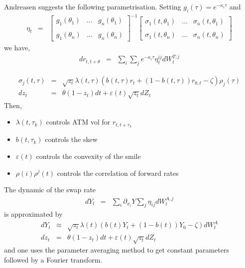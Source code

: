 \documentclass[11pt,english]{amsart}
\theoremstyle{definition}
\begin{document}
Andreasen suggests the following parametrisation. Setting $g_i(\tau) = e^{-\kappa_i \tau}$ and 
\begin{eqnarray*}
  \eta_{t} &=& \begin{bmatrix} g_1(\theta_1) & \ldots & g_n(\theta_1) \\  \\ g_1(\theta_n) & \ldots & g_n(\theta_n) \end{bmatrix}^{-1} \begin{bmatrix} \sigma_1(t,\theta_1) & \ldots & \sigma_n(t,\theta_1) \\  \\ \sigma_1(t,\theta_n) & \ldots & \sigma_n(t,\theta_n) \end{bmatrix}
\end{eqnarray*}
we have,
\begin{eqnarray*}
  dr_{t,t+\theta} &=& \sum_i \sum_j e^{-\kappa_i \tau} \eta^{ij}_t dW^{T;j}_t 
\end{eqnarray*}

\begin{eqnarray*}
  \sigma_j(t,\tau) &=& \sqrt{z_t} \lambda(t,\tau)\left( b(t,\tau) r_t + (1-b(t,\tau)) r_{0,t} - \zeta \right) \rho_j(\tau) \\
  dz_t &=& \theta(1-z_t)dt + \varepsilon(t) \sqrt{z_t} dZ_t 
\end{eqnarray*}
Then, 
\begin{itemize}
\item $\lambda(t,\tau_k)$ controls ATM vol for $r_{t,t+\tau_k}$
\item $b(t,\tau_k)$ controls the skew
\item $\varepsilon(t)$ controls the convexity of the smile
\item $\rho(i)\rho^j(t)$ controls the correlation of forward rates 
\end{itemize}

The dynamic of the swap rate 
\begin{eqnarray*}
  dY_t &=& \sum_i \partial_{x_i} Y \sum_j \eta_{ij}dW^{A,j}_t 
\end{eqnarray*}
is approximated by 
\begin{eqnarray*}
  dY_t &\approx& \sqrt{z_t} \lambda(t)\left( b(t) Y_t + (1-b(t)) Y_{0} - \zeta \right) dW^{A}_t \\
  dz_t &=& \theta(1-z_t)dt + \varepsilon(t) \sqrt{z_t} dZ_t 
\end{eqnarray*}
and one uses the parameter averaging method to get constant parameters followed by a Fourier transform. 
\end{document}
